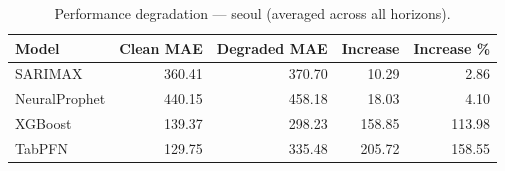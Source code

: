\begin{table}[h]
\centering
\caption{Performance degradation — seoul (averaged across all horizons).}
\label{tab:degradation_summary_seoul}
\begin{tabular}{lrrrr}
\toprule
Model & Clean MAE & Degraded MAE & Increase & Increase \% \\
\midrule
SARIMAX & 360.41 & 370.70 & 10.29 & 2.86 \\
NeuralProphet & 440.15 & 458.18 & 18.03 & 4.10 \\
XGBoost & 139.37 & 298.23 & 158.85 & 113.98 \\
TabPFN & 129.75 & 335.48 & 205.72 & 158.55 \\
\bottomrule
\end{tabular}
\end{table}
